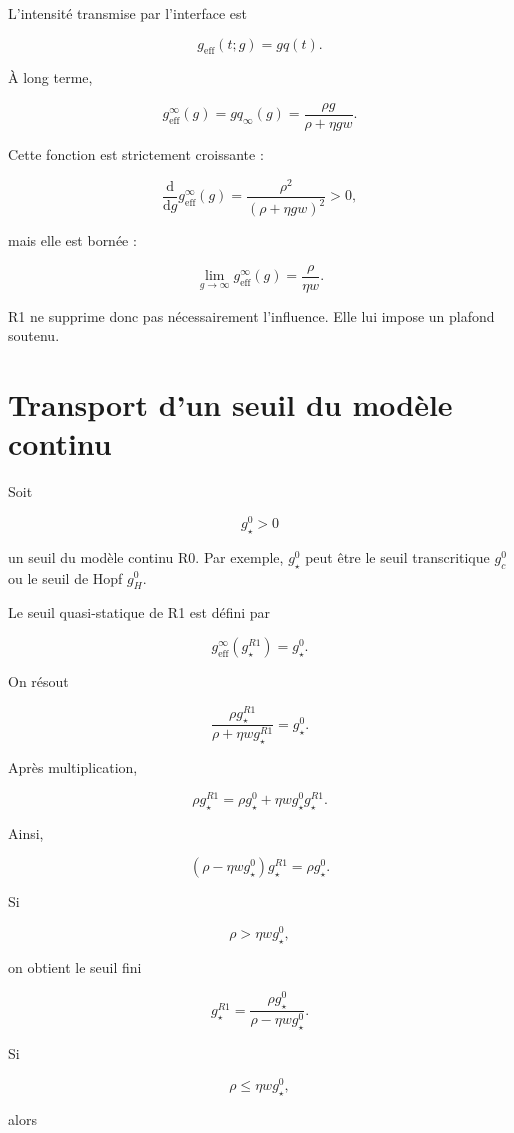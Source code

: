 L'intensité transmise par l'interface est

\[
g_{\mathrm{eff}}(t;g)
=
gq(t).
\]

À long terme,

\[
\boxed{
g_{\mathrm{eff}}^\infty(g)
=
gq_\infty(g)
=
\frac{\rho g}
{\rho+\eta gw}.
}
\]

Cette fonction est strictement croissante :

\[
\frac{\mathrm d}{\mathrm dg}
g_{\mathrm{eff}}^\infty(g)
=
\frac{\rho^2}
{\left(\rho+\eta gw\right)^2}
>0,
\]

mais elle est bornée :

\[
\boxed{
\lim_{g\to\infty}
g_{\mathrm{eff}}^\infty(g)
=
\frac{\rho}{\eta w}.
}
\]

R1 ne supprime donc pas nécessairement l'influence. Elle lui impose un
plafond soutenu.

\section{Transport d'un seuil du modèle continu}
\label{annexe-r1-transport-seuil}

Soit

\[
g_\star^0>0
\]

un seuil du modèle continu R0. Par exemple, \(g_\star^0\) peut être le
seuil transcritique \(g_c^0\) ou le seuil de Hopf \(g_H^0\).

Le seuil quasi-statique de R1 est défini par

\[
g_{\mathrm{eff}}^\infty
\left(
g_\star^{R1}
\right)
=
g_\star^0.
\]

On résout

\[
\frac{\rho g_\star^{R1}}
{\rho+\eta wg_\star^{R1}}
=
g_\star^0.
\]

Après multiplication,

\[
\rho g_\star^{R1}
=
\rho g_\star^0
+
\eta wg_\star^0g_\star^{R1}.
\]

Ainsi,

\[
\left(
\rho-\eta wg_\star^0
\right)
g_\star^{R1}
=
\rho g_\star^0.
\]

Si

\[
\rho>\eta wg_\star^0,
\]

on obtient le seuil fini

\[
\boxed{
g_\star^{R1}
=
\frac{\rho g_\star^0}
{\rho-\eta wg_\star^0}.
}
\]

Si

\[
\rho\leq\eta wg_\star^0,
\]

alors

